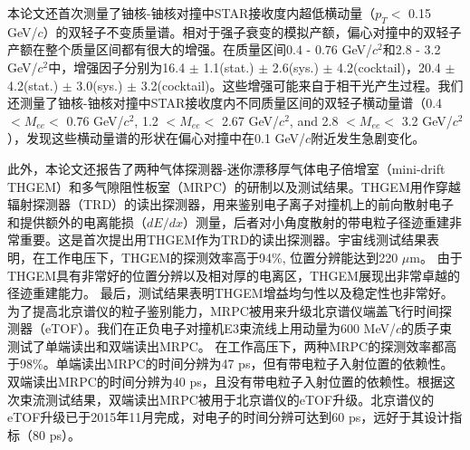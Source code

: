 \begin{cnabstract}
本论文还首次测量了铀核-铀核对撞中STAR接收度内超低横动量（$p_{T}<$ 0.15 GeV/$c$）的双轻子不变质量谱。相对于强子衰变的模拟产额，偏心对撞中的双轻子产额在整个质量区间都有很大的增强。在质量区间0.4 - 0.76 GeV/$c^{2}$和2.8 - 3.2 GeV/$c^{2}$中，增强因子分别为16.4 $\pm$ 1.1(stat.) $\pm$ 2.6(sys.) $\pm$ 4.2(cocktail)，20.4 $\pm$ 4.2(stat.) $\pm$ 3.0(sys.) $\pm$ 3.2(cocktail)。这些增强可能来自于相干光产生过程。我们还测量了铀核-铀核对撞中STAR接收度内不同质量区间的双轻子横动量谱（0.4 $<M_{ee}<$ 0.76 GeV/$c^{2}$, 1.2 $<M_{ee}<$ 2.67 GeV/$c^{2}$, and 2.8 $<M_{ee}<$ 3.2 GeV/$c^{2}$），发现这些横动量谱的形状在偏心对撞中在0.1 GeV/$c$附近发生急剧变化。

此外，本论文还报告了两种气体探测器-迷你漂移厚气体电子倍增室（mini-drift THGEM）和多气隙阻性板室（MRPC）的研制以及测试结果。THGEM用作穿越辐射探测器（TRD）的读出探测器，用来鉴别电子离子对撞机上的前向散射电子和提供额外的电离能损（$dE/dx$）测量，后者对小角度散射的带电粒子径迹重建非常重要。这是首次提出用THGEM作为TRD的读出探测器。宇宙线测试结果表明，在工作电压下，THGEM的探测效率高于94\%, 位置分辨能达到220 $\mu$m。 由于THGEM具有非常好的位置分辨以及相对厚的电离区，THGEM展现出非常卓越的径迹重建能力。 最后，测试结果表明THGEM增益均匀性以及稳定性也非常好。为了提高北京谱仪的粒子鉴别能力，MRPC被用来升级北京谱仪端盖飞行时间探测器（eTOF）。我们在正负电子对撞机E3束流线上用动量为600 MeV/$c$的质子束测试了单端读出和双端读出MRPC。 在工作高压下，两种MRPC的探测效率都高于98\%。单端读出MRPC的时间分辨为47 ps，但有带电粒子入射位置的依赖性。双端读出MRPC的时间分辨为40 ps，且没有带电粒子入射位置的依赖性。根据这次束流测试结果，双端读出MRPC被用于北京谱仪的eTOF升级。北京谱仪的eTOF升级已于2015年11月完成，对电子的时间分辨可达到60 ps，远好于其设计指标（80 ps）。

\end{cnabstract}

